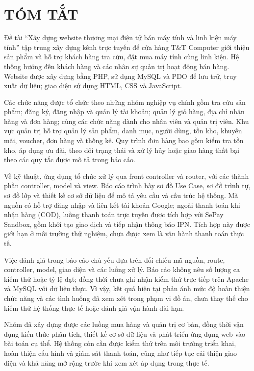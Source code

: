 \chapter*{TÓM TẮT}
\vspace{-40pt}

Đề tài ``Xây dựng website thương mại điện tử bán máy tính và linh kiện máy tính'' tập trung xây dựng kênh trực tuyến để cửa hàng T\&T Computer giới thiệu sản phẩm và hỗ trợ khách hàng tra cứu, đặt mua máy tính cùng linh kiện. Hệ thống hướng đến khách hàng và các nhân sự quản trị hoạt động bán hàng. Website được xây dựng bằng PHP, sử dụng MySQL và PDO để lưu trữ, truy xuất dữ liệu; giao diện sử dụng HTML, CSS và JavaScript.

Các chức năng được tổ chức theo những nhóm nghiệp vụ chính gồm tra cứu sản phẩm; đăng ký, đăng nhập và quản lý tài khoản; quản lý giỏ hàng, địa chỉ nhận hàng và đơn hàng; cùng các chức năng dành cho nhân viên và quản trị viên. Khu vực quản trị hỗ trợ quản lý sản phẩm, danh mục, người dùng, tồn kho, khuyến mãi, voucher, đơn hàng và thống kê. Quy trình đơn hàng bao gồm kiểm tra tồn kho, áp dụng ưu đãi, theo dõi trạng thái và xử lý hủy hoặc giao hàng thất bại theo các quy tắc được mô tả trong báo cáo.

Về kỹ thuật, ứng dụng tổ chức xử lý qua front controller và router, với các thành phần controller, model và view. Báo cáo trình bày sơ đồ Use Case, sơ đồ trình tự, sơ đồ lớp và thiết kế cơ sở dữ liệu để mô tả yêu cầu và cấu trúc hệ thống. Mã nguồn có hỗ trợ đăng nhập và liên kết tài khoản Google; ngoài thanh toán khi nhận hàng (COD), luồng thanh toán trực tuyến được tích hợp với SePay Sandbox, gồm khởi tạo giao dịch và tiếp nhận thông báo IPN. Tích hợp này được giới hạn ở môi trường thử nghiệm, chưa được xem là vận hành thanh toán thực tế.

Việc đánh giá trong báo cáo chủ yếu dựa trên đối chiếu mã nguồn, route, controller, model, giao diện và các luồng xử lý. Báo cáo không nêu số lượng ca kiểm thử hoặc tỷ lệ đạt; đồng thời chưa ghi nhận kiểm thử trực tiếp trên Apache và MySQL với dữ liệu thực. Vì vậy, kết quả hiện tại phản ánh mức độ hoàn thiện chức năng và các tình huống đã xem xét trong phạm vi đồ án, chưa thay thế cho kiểm thử hệ thống thực tế hoặc đánh giá vận hành dài hạn.

Nhóm đã xây dựng được các luồng mua hàng và quản trị cơ bản, đồng thời vận dụng kiến thức phân tích, thiết kế cơ sở dữ liệu và phát triển ứng dụng web vào bài toán cụ thể. Hệ thống còn cần được kiểm thử trên môi trường triển khai, hoàn thiện cấu hình và giám sát thanh toán, cũng như tiếp tục cải thiện giao diện và khả năng mở rộng trước khi xem xét áp dụng trong thực tế.

